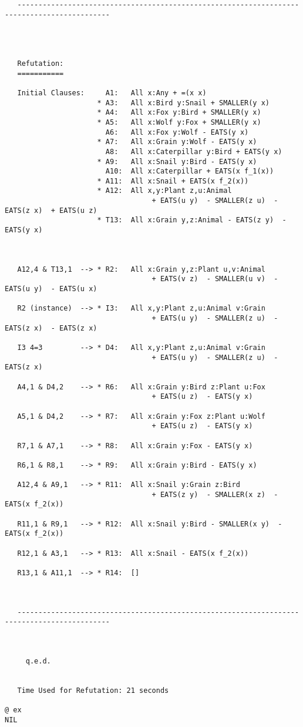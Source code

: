 {\begin{verbatim}
   --------------------------------------------------------------------------------------------




   Refutation:
   ===========
   
   Initial Clauses:     A1:   All x:Any + =(x x)
                      * A3:   All x:Bird y:Snail + SMALLER(y x)
                      * A4:   All x:Fox y:Bird + SMALLER(y x)
                      * A5:   All x:Wolf y:Fox + SMALLER(y x)
                        A6:   All x:Fox y:Wolf - EATS(y x)
                      * A7:   All x:Grain y:Wolf - EATS(y x)
                        A8:   All x:Caterpillar y:Bird + EATS(y x)
                      * A9:   All x:Snail y:Bird - EATS(y x)
                        A10:  All x:Caterpillar + EATS(x f_1(x))
                      * A11:  All x:Snail + EATS(x f_2(x))
                      * A12:  All x,y:Plant z,u:Animal 
                                   + EATS(u y)  - SMALLER(z u)  - EATS(z x)  + EATS(u z)
                      * T13:  All x:Grain y,z:Animal - EATS(z y)  - EATS(y x)
                      

   
   A12,4 & T13,1  --> * R2:   All x:Grain y,z:Plant u,v:Animal 
                                   + EATS(v z)  - SMALLER(u v)  - EATS(u y)  - EATS(u x)
   
   R2 (instance)  --> * I3:   All x,y:Plant z,u:Animal v:Grain 
                                   + EATS(u y)  - SMALLER(z u)  - EATS(z x)  - EATS(z x)
   
   I3 4=3         --> * D4:   All x,y:Plant z,u:Animal v:Grain 
                                   + EATS(u y)  - SMALLER(z u)  - EATS(z x)
   
   A4,1 & D4,2    --> * R6:   All x:Grain y:Bird z:Plant u:Fox 
                                   + EATS(u z)  - EATS(y x)
   
   A5,1 & D4,2    --> * R7:   All x:Grain y:Fox z:Plant u:Wolf 
                                   + EATS(u z)  - EATS(y x)
   
   R7,1 & A7,1    --> * R8:   All x:Grain y:Fox - EATS(y x)
   
   R6,1 & R8,1    --> * R9:   All x:Grain y:Bird - EATS(y x)
   
   A12,4 & A9,1   --> * R11:  All x:Snail y:Grain z:Bird 
                                   + EATS(z y)  - SMALLER(x z)  - EATS(x f_2(x))
   
   R11,1 & R9,1   --> * R12:  All x:Snail y:Bird - SMALLER(x y)  - EATS(x f_2(x))
   
   R12,1 & A3,1   --> * R13:  All x:Snail - EATS(x f_2(x))
   
   R13,1 & A11,1  --> * R14:  []
   

   
   --------------------------------------------------------------------------------------------



     q.e.d. 


   Time Used for Refutation: 21 seconds

@ ex
NIL
\end{verbatim}

} %